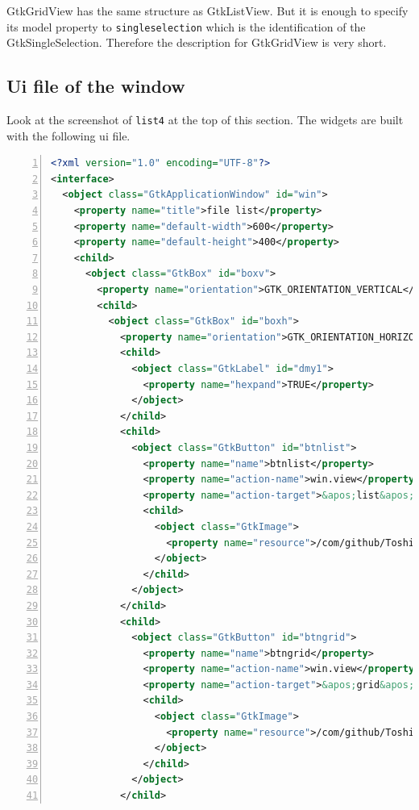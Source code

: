 GtkGridView has the same structure as GtkListView. But it is enough to
specify its model property to \passthrough{\lstinline!singleselection!}
which is the identification of the GtkSingleSelection. Therefore the
description for GtkGridView is very short.

\hypertarget{ui-file-of-the-window}{%
\subsection{Ui file of the window}\label{ui-file-of-the-window}}

Look at the screenshot of \passthrough{\lstinline!list4!} at the top of
this section. The widgets are built with the following ui file.

\begin{lstlisting}[language=XML, numbers=left]
<?xml version="1.0" encoding="UTF-8"?>
<interface>
  <object class="GtkApplicationWindow" id="win">
    <property name="title">file list</property>
    <property name="default-width">600</property>
    <property name="default-height">400</property>
    <child>
      <object class="GtkBox" id="boxv">
        <property name="orientation">GTK_ORIENTATION_VERTICAL</property>
        <child>
          <object class="GtkBox" id="boxh">
            <property name="orientation">GTK_ORIENTATION_HORIZONTAL</property>
            <child>
              <object class="GtkLabel" id="dmy1">
                <property name="hexpand">TRUE</property>
              </object>
            </child>
            <child>
              <object class="GtkButton" id="btnlist">
                <property name="name">btnlist</property>
                <property name="action-name">win.view</property>
                <property name="action-target">&apos;list&apos;</property>
                <child>
                  <object class="GtkImage">
                    <property name="resource">/com/github/ToshioCP/list4/list.png</property>
                  </object>
                </child>
              </object>
            </child>
            <child>
              <object class="GtkButton" id="btngrid">
                <property name="name">btngrid</property>
                <property name="action-name">win.view</property>
                <property name="action-target">&apos;grid&apos;</property>
                <child>
                  <object class="GtkImage">
                    <property name="resource">/com/github/ToshioCP/list4/grid.png</property>
                  </object>
                </child>
              </object>
            </child>

\end{lstlisting}
